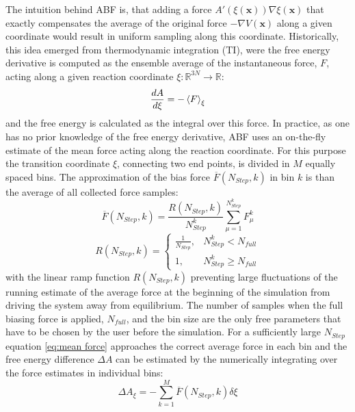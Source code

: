 The intuition behind ABF is, that adding a force $A'(\xi(\textbf{x}))\nabla \xi(\textbf{x})$ that exactly compensates the average of the original force $-\nabla V(\textbf{x})$ along a given coordinate would result in uniform sampling along this coordinate.\autocite{comer2015adaptive}
Historically, this idea emerged from thermodynamic integration (TI), were the free energy derivative  is computed as the ensemble average of the instantaneous force, $F$, acting along a given reaction coordinate $\xi: \mathbb{R} ^{3N} \to \mathbb{R}$:
\begin{equation}
\frac{dA}{d\xi} = -\braket{F}_{\xi}
\end{equation}
and the free energy is calculated as the integral over this force.\autocite{kirkwood1935statistical,zwanzig1954high}
In practice, as one has no prior knowledge of the free energy derivative, ABF uses an on-the-fly estimate of the mean force acting along the reaction coordinate. For this purpose the transition coordinate $\xi$, connecting two end points, is divided in $M$ equally spaced bins. The approximation of the bias force $\overline{F}(N_{Step},k)$ in bin $k$ is than the average of all collected force samples:\autocite{comer2015adaptive}
\begin{equation}
  \overline{F}(N_{Step},k) = \frac{R(N_{Step},k)}{N_{Step}^{k}} \sum_{\mu=1}^{N_{Step}^{k}} F_{\mu}^{k}
  \label{eq:mean force}
\end{equation}
\begin{equation}
  R(N_{Step},k)=\left\{\begin{array}{ll} \frac{1}{N_{Step}}, & N_{Step}^{k} < N_{full} \\
                                         1,          & N_{Step}^{k} \geq  N_{full} \end{array}\right. \label{eq:ramp}
\end{equation}
with the linear ramp function $R(N_{Step},k)$ preventing large fluctuations of the running estimate of the average force at the beginning of the simulation from driving the system away from equilibrium. The number of samples when the full biasing force is applied, $N_{full}$, and the bin size are the only free parameters that have to be chosen by the user before the simulation. For a sufficiently large $N_{Step}$ equation \ref{eq:mean force} approaches the correct average force in each bin and the free energy difference $\Delta A$ can be estimated by the numerically integrating over the force estimates in individual bins:\autocite{comer2015adaptive}
\begin{equation}
  \Delta A_{\xi} = - \sum_{k=1}^{M} \overline{F}(N_{Step},k) \delta \xi
\end{equation}

